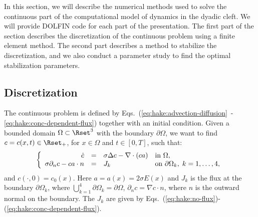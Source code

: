 In this section, we will describe the numerical methods used to solve
the continuous part of the computational model of \Ca dynamics in the
dyadic cleft. We will provide DOLFIN code for each part of the
presentation. The first part of the section describes the
discretization of the continuous problem using a finite element
method. The second part describes a method to stabilize the
discretization, and we also conduct a parameter study to find the
optimal stabilization parameters.
\subsection{Discretization}
\label{sec:hake:discretization}

The continuous problem is defined by
Eqs.~(\ref{eq:hake:advection-diffusion}~-\ref{eq:hake:conc-dependent-flux})
together with an initial condition. Given a bounded domain $\Omega
\subset \Rset^3$ with the boundary $\partial\Omega$, we want to find
$c = c(x,t) \in \Rset_+$, for $x\in \Omega$ and $t \in [0,T]$, such
that:
\begin{equation}
\label{eq:hake:full_system}
\left\{
  \begin{array}{r@{\quad=\quad}ll}
    \dot{c}&\sigma\Delta c - \nabla\cdot\left(ca\right)&  \text{in } \Omega, \\
    \sigma\partial_nc-ca\cdot n&J_k& \text{on } \partial\Omega_k,\; k = 1,\ldots,4,
  \end{array}
\right.
\end{equation}
and $c(\cdot,0) = c_0(x)$. Here $a=a(x)=2\sigma E(x)$ and $J_k$ is the
\kth flux at the \kth boundary $\partial\Omega_k$, where
$\bigcup^4_{k=1}\partial\Omega_k=\partial\Omega$, $\partial_nc =
\nabla c\cdot n$, where $n$ is the outward normal on the boundary. The
$J_k$ are given by
Eqs.~(\ref{eq:hake:no-flux})-(\ref{eq:hake:conc-dependent-flux}).


